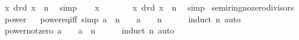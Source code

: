\begin{isabellebody}
\ {\isachardoublequoteopen}x\ dvd\ {\isacharparenleft}{\kern0pt}x\ {\isacharcircum}{\kern0pt}\ n{\isacharparenright}{\kern0pt}{\isachardoublequoteclose}\ \isamarkupfalse%
\ simp\isanewline
{}\isamarkupfalse%
\isanewline
\ \ \isamarkupfalse%
\ {\isachardoublequoteopen}x\ {\isacharequal}{\kern0pt}\ {}{\isachardoublequoteclose}\isanewline
\ \ \isamarkupfalse%
\ \isamarkupfalse%
\ {\isachardoublequoteopen}x\ dvd\ {\isacharparenleft}{\kern0pt}x\ {\isacharcircum}{\kern0pt}\ n{\isacharparenright}{\kern0pt}{\isachardoublequoteclose}\ \isamarkupfalse%
\ simp\isanewline
{}\isamarkupfalse%
%
\endisatagproof
{\isafoldproof}%
%
\isadelimproof
\isanewline
%
\endisadelimproof
\isanewline
{}\isamarkupfalse%
\isanewline
\isanewline
{}\isamarkupfalse%
\ semiring{\isacharunderscore}{\kern0pt}{}{\isacharunderscore}{\kern0pt}no{\isacharunderscore}{\kern0pt}zero{\isacharunderscore}{\kern0pt}divisors\isanewline
{}\isanewline
\isanewline
{}\isamarkupfalse%
\ power%
\isadelimproof
\ %
\endisadelimproof
%
\isatagproof
\isacommand{{\isachardot}{\kern0pt}}\isamarkupfalse%
%
\endisatagproof
{\isafoldproof}%
%
\isadelimproof
%
\endisadelimproof
\isanewline
\isanewline
{}\isamarkupfalse%
\ power{\isacharunderscore}{\kern0pt}eq{\isacharunderscore}{\kern0pt}{}{\isacharunderscore}{\kern0pt}iff\ {\isacharbrackleft}{\kern0pt}simp{\isacharbrackright}{\kern0pt}{\isacharcolon}{\kern0pt}\ {\isachardoublequoteopen}a\ {\isacharcircum}{\kern0pt}\ n\ {\isacharequal}{\kern0pt}\ {}\ {\isasymlongleftrightarrow}\ a\ {\isacharequal}{\kern0pt}\ {}\ {\isasymand}\ n\ {\isachargreater}{\kern0pt}\ {}{\isachardoublequoteclose}\isanewline
%
\isadelimproof
\ \ %
\endisadelimproof
%
\isatagproof
{}\isamarkupfalse%
\ {\isacharparenleft}{\kern0pt}induct\ n{\isacharparenright}{\kern0pt}\ auto%
\endisatagproof
{\isafoldproof}%
%
\isadelimproof
\isanewline
%
\endisadelimproof
\isanewline
{}\isamarkupfalse%
\ power{\isacharunderscore}{\kern0pt}not{\isacharunderscore}{\kern0pt}zero{\isacharcolon}{\kern0pt}\ {\isachardoublequoteopen}a\ {\isasymnoteq}\ {}\ {\isasymLongrightarrow}\ a\ {\isacharcircum}{\kern0pt}\ n\ {\isasymnoteq}\ {}{\isachardoublequoteclose}\isanewline
%
\isadelimproof
\ \ %
\endisadelimproof
%
\isatagproof
{}\isamarkupfalse%
\ {\isacharparenleft}{\kern0pt}induct\ n{\isacharparenright}{\kern0pt}\ auto%

\end{isabellebody}
